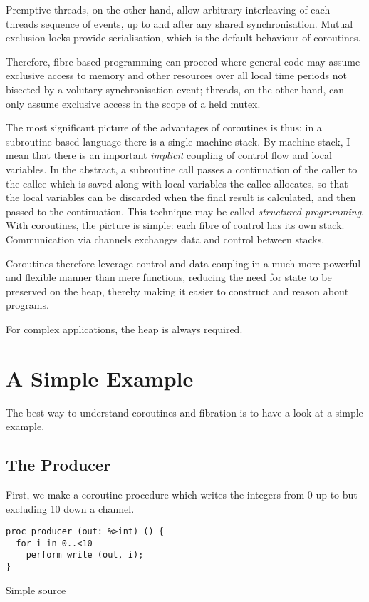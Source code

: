 \documentclass[oneside]{book}
\begin{document}
Premptive threads, on the other hand, allow arbitrary interleaving of
each threads sequence of events, up to and after any shared synchronisation.
Mutual exclusion locks provide serialisation, which is the default behaviour
of coroutines.

Therefore, fibre based programming can proceed where general code
may assume exclusive access to memory and other resources over all
local time periods not bisected by a volutary synchronisation event;
threads, on the other hand, can only assume exclusive access in the
scope of a held mutex.


The most significant picture of the advantages of coroutines is thus: in a subroutine
based language there is a single machine stack. By machine stack, I mean that
there is an important {\em implicit} coupling of control flow and local variables.
In the abstract, a subroutine call passes a continuation of the caller to 
the callee which is saved along with local variables the callee allocates,
so that the local variables can be discarded when the final result is
calculated, and then passed to the continuation. This technique may be
called {\em structured programming}. With coroutines, the picture is simple:
each fibre of control has its own stack. Communication via channels exchanges data
and control between stacks.

Coroutines therefore leverage control and data coupling in a much more
powerful and flexible manner than mere functions, reducing the need for
state to be preserved on the heap, thereby making it easier to construct
and reason about programs.

For complex applications, the heap is always required.


\section{A Simple Example}
The best way to understand coroutines and fibration is to have a look
at a simple example. 

\subsection{The Producer}
First, we make a coroutine procedure which writes the integers
from 0 up to but excluding 10 down a channel.

\begin{listing}
\begin{verbatim}
proc producer (out: %>int) () {
  for i in 0..<10 
    perform write (out, i);
}
\end{verbatim}
\caption{Simple source}
\label{lst:Simple source}
\end{listing}
\end{document}
